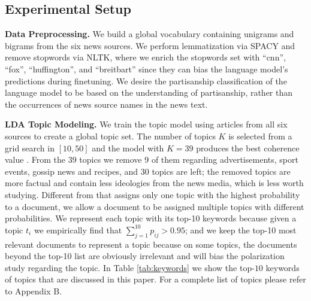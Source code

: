 \documentclass[11pt]{article}
\begin{document}
\subsection{Experimental Setup}
\textbf{Data Preprocessing.} We build a global vocabulary containing unigrams and bigrams from the six news sources. We perform lemmatization via SPACY and remove stopwords via NLTK, where we enrich the stopwords set with ``cnn'', ``fox'', ``huffington'', and ``breitbart'' since they can bias the language model's predictions during finetuning. We desire the partisanship classification of the language model to be based on the understanding of partisanship, rather than the occurrences of news source names in the news text.

\textbf{LDA Topic Modeling.} 
We train the topic model using articles from all six sources to create a global topic set. 
The number of topics $K$ is selected from a grid search in $[10, 50]$ and the model with $K=39$ produces the best coherence value \cite{roder2015exploring}. From the 39 topics we remove 9 of them regarding advertisements, sport events, gossip news and recipes, and 30 topics are left; the removed topics are more factual and contain less ideologies from the news media, which is less worth studying.
Different from \cite{demszky2019analyzing} that assigns only one topic with the highest probability to a document, we allow a document to be assigned multiple topics with different probabilities. We represent each topic with its top-10 keywords because given a topic $t_i$ we empirically find that  $\sum_{j=1}^{10} p_{ij}>0.95$; and we keep the top-10 most relevant documents to represent a topic because 
on some topics, the documents beyond the top-10 list are obviously irrelevant and will bias the polarization study regarding the topic.
In Table \ref{tab:keywords} we show the top-$10$ keywords of topics that are discussed in this paper. For a complete list of topics please refer to Appendix B.
\end{document}
